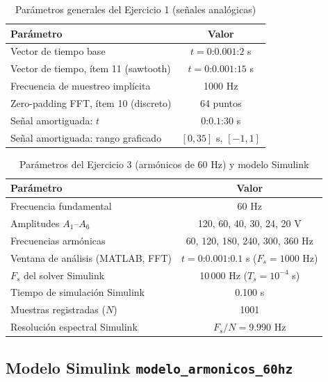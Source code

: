 \documentclass[conference]{IEEEtran}
\begin{document}
\begin{table}[!t]
\centering
\caption{Parámetros generales del Ejercicio 1 (señales analógicas)}
\label{tab:parametros_ej1}
\begin{tabular}{|l|c|}
\hline
\textbf{Parámetro} & \textbf{Valor} \\ \hline
Vector de tiempo base & $t=0$:$0.001$:$2$ s \\ \hline
Vector de tiempo, ítem 11 (sawtooth) & $t=0$:$0.001$:$15$ s \\ \hline
Frecuencia de muestreo implícita & 1000 Hz \\ \hline
Zero-padding FFT, ítem 10 (discreto) & 64 puntos \\ \hline
Señal amortiguada: $t$ & $0$:$0.1$:$30$ s \\ \hline
Señal amortiguada: rango graficado & $[0,35]$ s, $[-1,1]$ \\ \hline
\end{tabular}
\end{table}

\begin{table}[!t]
\centering
\caption{Parámetros del Ejercicio 3 (armónicos de 60 Hz) y modelo Simulink}
\label{tab:parametros_ej3}
\begin{tabular}{|l|c|}
\hline
\textbf{Parámetro} & \textbf{Valor} \\ \hline
Frecuencia fundamental & 60 Hz \\ \hline
Amplitudes $A_1$--$A_6$ & 120, 60, 40, 30, 24, 20 V \\ \hline
Frecuencias armónicas & 60, 120, 180, 240, 300, 360 Hz \\ \hline
Ventana de análisis (MATLAB, FFT) & $t=0$:$0.001$:$0.1$ s ($F_s{=}1000$ Hz) \\ \hline
$F_s$ del solver Simulink & 10\,000 Hz ($T_s=10^{-4}$ s) \\ \hline
Tiempo de simulación Simulink & 0.100 s \\ \hline
Muestras registradas ($N$) & 1001 \\ \hline
Resolución espectral Simulink & $F_s/N = 9.990$ Hz \\ \hline
\end{tabular}
\end{table}

\subsection{Modelo Simulink \texttt{modelo\_armonicos\_60hz}}
\end{document}
